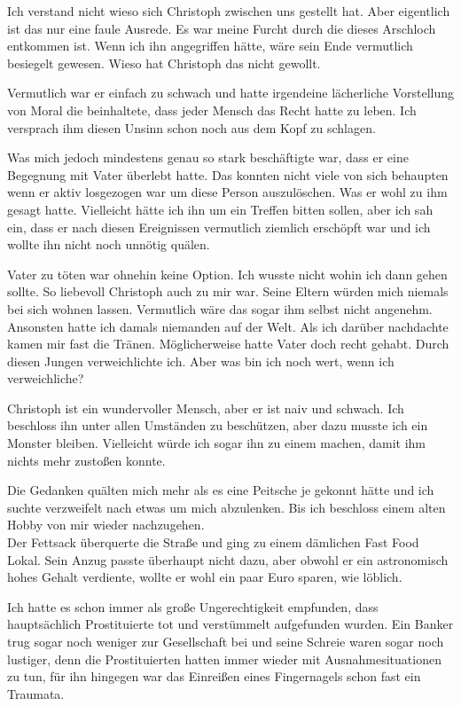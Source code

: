 \documentclass[11pt, a5paper]{article}
\newcommand{\e}{Christoph }
\begin{document}
\begin{spacing}{1.2}
		Ich verstand nicht wieso sich \e zwischen uns gestellt hat. Aber eigentlich ist das nur eine faule Ausrede. Es war meine Furcht durch die dieses Arschloch entkommen ist. Wenn ich ihn angegriffen hätte, wäre sein Ende vermutlich besiegelt gewesen. Wieso hat \e das nicht gewollt.
		
		Vermutlich war er einfach zu schwach und hatte irgendeine lächerliche Vorstellung von Moral die beinhaltete, dass jeder Mensch das Recht hatte zu leben. Ich versprach ihm diesen Unsinn schon noch aus dem Kopf zu schlagen.
		
		Was mich jedoch mindestens genau so stark beschäftigte war, dass er eine Begegnung mit Vater überlebt hatte. Das konnten nicht viele von sich behaupten wenn er aktiv losgezogen war um diese Person auszulöschen. Was er wohl zu ihm gesagt hatte. Vielleicht hätte ich ihn um ein Treffen bitten sollen, aber ich sah ein, dass er nach diesen Ereignissen vermutlich ziemlich erschöpft war und ich wollte ihn nicht noch unnötig quälen.
		
		Vater zu töten war ohnehin keine Option. Ich wusste nicht wohin ich dann gehen sollte. So liebevoll \e auch zu mir war. Seine Eltern würden mich niemals bei sich wohnen lassen. Vermutlich wäre das sogar ihm selbst nicht angenehm. Ansonsten hatte ich damals niemanden auf der Welt. Als ich darüber nachdachte kamen mir fast die Tränen. Möglicherweise hatte Vater doch recht gehabt. Durch diesen Jungen verweichlichte ich. Aber was bin ich noch wert, wenn ich verweichliche?
		
		\e ist ein wundervoller Mensch, aber er ist naiv und schwach. Ich beschloss ihn unter allen Umständen zu beschützen, aber dazu musste ich ein Monster bleiben. Vielleicht würde ich sogar ihn zu einem machen, damit ihm nichts mehr zustoßen konnte.
		
		Die Gedanken quälten mich mehr als es eine Peitsche je gekonnt hätte und ich suchte verzweifelt nach etwas um mich abzulenken. Bis ich beschloss einem alten Hobby von mir wieder nachzugehen.\\
		
		Der Fettsack überquerte die Straße und ging zu einem dämlichen Fast Food Lokal. Sein Anzug passte überhaupt nicht dazu, aber obwohl er ein astronomisch hohes Gehalt verdiente, wollte er wohl ein paar Euro sparen, wie löblich.
		
		Ich hatte es schon immer als große Ungerechtigkeit empfunden, dass hauptsächlich Prostituierte tot und verstümmelt aufgefunden wurden. Ein Banker trug sogar noch weniger zur Gesellschaft bei und seine Schreie waren sogar noch lustiger, denn die Prostituierten hatten immer wieder mit Ausnahmesituationen zu tun, für ihn hingegen war das Einreißen eines Fingernagels schon fast ein Traumata.
		

\end{spacing}
\end{document}

